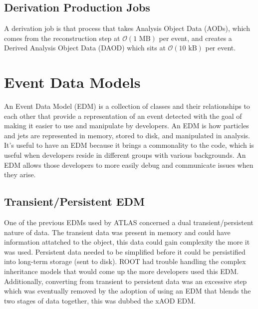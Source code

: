 \subsection{Derivation Production Jobs}
A derivation job is that process that takes Analysis Object Data (AODs), which comes from the reconstruction step at $\mathcal{O}(1 \text{ MB})$ per event, and creates a Derived Analysis Object Data (DAOD) which sits at $\mathcal{O}(10 \text{ kB})$ per event.


\section{Event Data Models}
An Event Data Model (EDM) is a collection of classes and their relationships to each other that provide a representation of an event detected with the goal of making it easier to use and manipulate by developers.
An EDM is how particles and jets are represented in memory, stored to disk, and manipulated in analysis.
It's useful to have an EDM because it brings a commonality to the code, which is useful when developers reside in different groups with various backgrounds.
An EDM allows those developers to more easily debug and communicate issues when they arise.  

\subsection{Transient/Persistent EDM}
One of the previous EDMs used by ATLAS concerned a dual transient/persistent nature of data.
The transient data was present in memory and could have information attatched to the object, this data could gain complexity the more it was used.
Persistent data needed to be simplified before it could be persistified into long-term storage (sent to disk). 
ROOT had trouble handling the complex inheritance models that would come up the more developers used this EDM. 
Additionally, converting from transient to persistent data was an excessive step which was eventually removed by the adoption of using an EDM that blends the two stages of data together, this was dubbed the xAOD EDM.